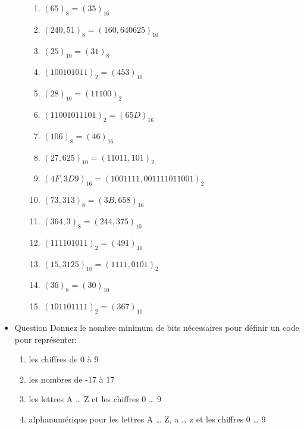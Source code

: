 \documentclass[letter, oneside]{book}
\begin{document}
\begin{itemize}
\begin{itemize}
\begin{enumerate}
\item \((65)_{8} = (35)_{16}\)

\item \((240,51)_{8} = (160,640625)_{10}\)

\item \((25)_{10} = (31)_{8}\)

\item \((100101011)_{2} = (453)_{10}\)

\item \((28)_{10} = (11100)_{2}\)

\item \((11001011101)_{2} = (65D)_{16}\)

\item \((106)_{8} = (46)_{16}\)

\item \((27,625)_{10} = (11011,101)_{2}\)

\item \((4F,3D9)_{16} = (1001111,001111011001)_{2}\)

\item \((73,313)_{8} = (3B,658)_{16}\)

\item \((364,3)_{8} = (244,375)_{10}\)

\item \((111101011)_{2} = (491)_{10}\)

\item \((15,3125)_{10} = (1111,0101)_{2}\)

\item \((36)_{8} = (30)_{10}\)

\item \((101101111)_{2} = (367)_{10}\)
\end{enumerate}
\end{itemize}

\item Question
\label{sec:orgc0cee71}
Donnez le nombre minimum de bits nécessaires pour définir un code pour
représenter:

\begin{enumerate}
\item les chiffres de 0 à 9

\item les nombres de -17 à 17

\item les lettres A \dots{} Z et les chiffres 0 \dots{} 9

\item alphanumérique pour les lettres A \dots{} Z, a \dots{} z et les
chiffres 0 \dots{} 9
\end{enumerate}


\end{itemize}
\end{document}
